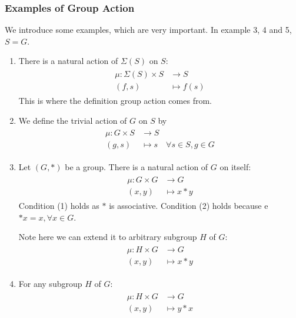 \documentclass{article}
\begin{document}
\subsubsection{Examples of Group Action}\label{exm:act} 
We introduce some examples, which are very important. In example 3, 4 and 5, $S=G$.
\begin{enumerate}
    \item There is a natural action of $\Sigma(S)$ on $S:$
\begin{align*}
\begin{aligned}
\mu: \Sigma(S) \times S & \rightarrow S \\
(f, s) & \mapsto f(s)
\end{aligned}
\end{align*}
This is where the definition group action comes from.
\item We define the trivial action of $G$ on $S$ by
\begin{align*}
\begin{aligned}
\mu: G \times S & \rightarrow S \\
(g, s) & \mapsto s \quad \forall s \in S, g \in G
\end{aligned}
\end{align*}

\item {} Let $(G, *)$ be a group. There is a natural action of $G$ on itself:
\begin{align*}
\begin{aligned}
\mu: G \times G & \rightarrow G \\
(x, y) & \mapsto x * y
\end{aligned}
\end{align*}
Condition (1) holds as $*$ is associative. Condition (2) holds because e $* x=x,  \forall x \in G$. 

Note here we can extend it to arbitrary subgroup $H$ of $G$:
\begin{align*}
\begin{aligned}
\mu: H \times G & \rightarrow G \\
(x, y) & \mapsto x * y
\end{aligned}
\end{align*}

\item {} For any subgroup $H$ of $G$:
\begin{align*}
\begin{aligned}
\mu: H \times G & \rightarrow G \\
(x, y) & \mapsto y*x
\end{aligned}
\end{align*}



\end{enumerate}
\end{document}
